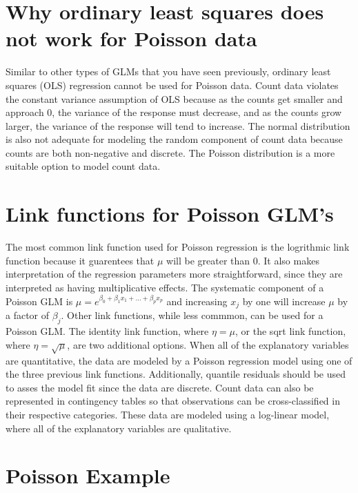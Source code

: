 \documentclass[
]{book}
\begin{document}
\hypertarget{why-ordinary-least-squares-does-not-work-for-poisson-data}{%
\section{Why ordinary least squares does not work for Poisson data}\label{why-ordinary-least-squares-does-not-work-for-poisson-data}}

Similar to other types of GLMs that you have seen previously, ordinary least squares (OLS) regression cannot be used for Poisson data. Count data violates the constant variance assumption of OLS because as the counts get smaller and approach 0, the variance of the response must decrease, and as the counts grow larger, the variance of the response will tend to increase. The normal distribution is also not adequate for modeling the random component of count data because counts are both non-negative and discrete. The Poisson distribution is a more suitable option to model count data.

\hypertarget{link-functions-for-poisson-glms}{%
\section{Link functions for Poisson GLM's}\label{link-functions-for-poisson-glms}}

The most common link function used for Poisson regression is the logrithmic link function because it guarentees that \(\mu\) will be greater than 0. It also makes interpretation of the regression parameters more straightforward, since they are interpreted as having multiplicative effects. The systematic component of a Poisson GLM is \(\mu = e^{\beta_0 + \beta_1x_1 + ... + \beta_px_p}\) and increasing \(x_j\) by one will increase \(\mu\) by a factor of \(\beta_j\). Other link functions, while less commmon, can be used for a Poisson GLM. The identity link function, where \(\eta = \mu\), or the sqrt link function, where \(\eta = \sqrt{\mu}\), are two additional options. When all of the explanatory variables are quantitative, the data are modeled by a Poisson regression model using one of the three previous link functions. Additionally, quantile residuals should be used to asses the model fit since the data are discrete. Count data can also be represented in contingency tables so that observations can be cross-classified in their respective categories. These data are modeled using a log-linear model, where all of the explanatory variables are qualitative.

\hypertarget{poisson-example}{%
\section{Poisson Example}\label{poisson-example}}
\end{document}
